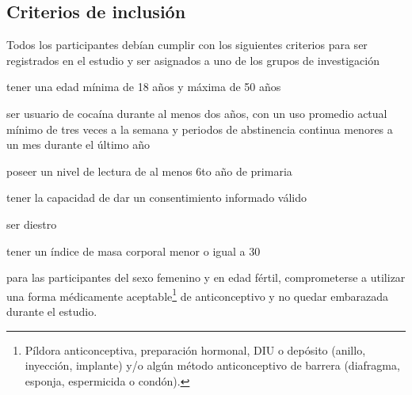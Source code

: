 \subsection{Criterios de inclusión}
Todos los participantes debían cumplir con los siguientes criterios para ser registrados en el estudio y ser asignados a uno de los grupos de investigación
\begin{enumerate*}[label=\emph{\alph*}), before=\unskip{: }, itemjoin={{; }}, itemjoin*={{, y }}]
    \item tener una edad mínima de 18 años y máxima de 50 años
    \item ser usuario de cocaína durante al menos dos  años, con un uso promedio actual mínimo de tres veces a la semana y periodos de abstinencia continua menores a un mes durante el último año
    \item poseer un nivel de lectura de al menos 6to año de primaria
    \item tener la capacidad de dar un consentimiento informado válido
    \item ser diestro
    \item tener un índice de masa corporal menor o igual a 30
    \item para las participantes del sexo femenino y en edad fértil, comprometerse a utilizar una forma médicamente aceptable\footnote{Píldora anticonceptiva, preparación hormonal, DIU o depósito (anillo, inyección, implante) y/o algún método anticonceptivo de barrera (diafragma, esponja, espermicida o condón).} de anticonceptivo y no quedar embarazada durante el estudio.
\end{enumerate*}

